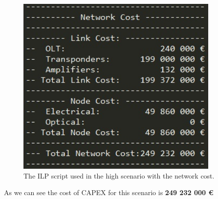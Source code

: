 \begin{figure}[h!]
\centering
\includegraphics[width=10cm]{sdf/ilp/opaque_protection/figures/script_opaque_protec_ref_high}
\caption{The ILP script used in the high scenario with the network cost.}
\label{scriptopaque_surv_ref_high}
\end{figure}

As we can see the cost of CAPEX for this scenario is \textbf{249 232 000 \euro}\\

